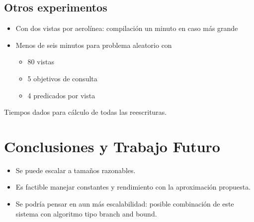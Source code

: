 \documentclass{beamer}
\begin{document}
\subsection{Otros experimentos}
\frame
{
\begin{itemize}
\item Con dos vistas por aerolínea: compilación un minuto en caso más grande
\item Menos de seis minutos para problema aleatorio con
\begin{itemize}
\item 80 vistas
\item 5 objetivos de consulta
\item 4 predicados por vista
\end{itemize}

\end{itemize}

Tiempos dados para cálculo de todas las reescrituras.
}


\section{Conclusiones y Trabajo Futuro}

\frame
{
\begin{itemize}
\item Se puede escalar a tamaños razonables.
\item Es factible manejar constantes y rendimiento con la aproximación
propuesta.
\item Se podría pensar en aun más escalabilidad: posible combinación de este
sistema con algoritmo tipo branch and bound.
\end{itemize}
}
\end{document}
